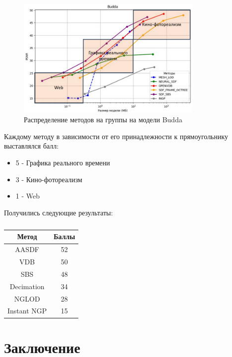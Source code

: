 \documentclass[a4paper,hidelinks,12pt]{article}
\begin{document}
\newpage

\begin{figure}[ht]
  \centering
  \includegraphics[width=0.8\textwidth]{budda1.png}
  \caption{Распределение методов на группы на модели Budda}
  \label{fig:example}
\end{figure}

\newpage

Каждому методу в зависимости от его принадлежности к прямоугольнику выставлялся балл:

\begin{itemize}
	\item 5 - Графика реального времени
	\item 3 - Кино-фотореализм
	\item 1 - Web
\end{itemize}

Получились следующие результаты:

\begin{table}[h!]
	\centering
	\begin{tabular}{|c|c|}
	\hline
	Метод & Баллы \\
	\hline
	AASDF \cite{aasdf} & 52 \\
	VDB \cite{vdb}   &  50 \\
	SBS \cite{octree} & 48 \\
	Decimation \cite{old_lods}  &  34 \\
	NGLOD \cite{nglod} & 28 \\
	Instant NGP \cite{ingp} & 15 \\
	\hline
	\end{tabular}
	\caption{}
	\label{tab:twocol}
	\end{table}

\newpage

\section{Заключение}
\end{document}
